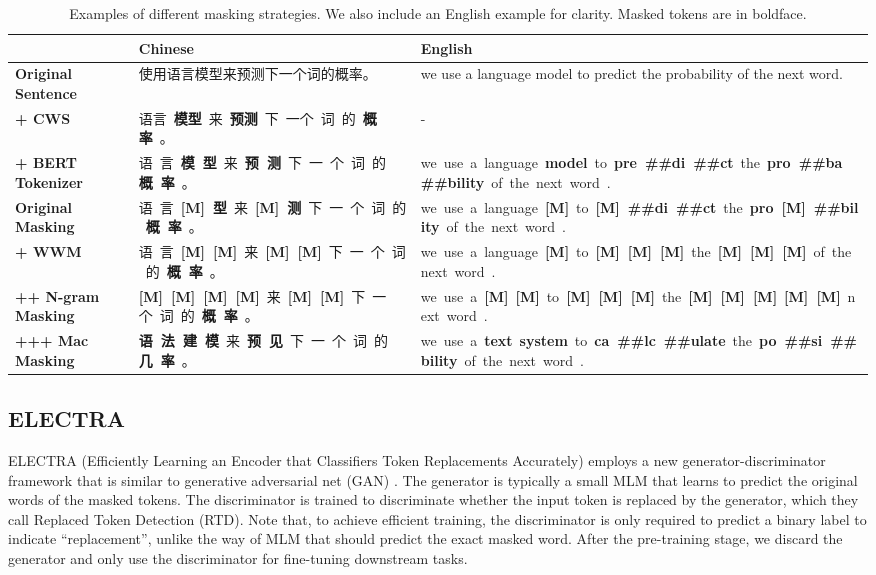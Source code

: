 \documentclass[journal]{IEEEtran}
\begin{document}
\begin{CJK*}{UTF8}{gbsn}
\begin{table*}[htbp]
\caption{\label{wwm-example} Examples of different masking strategies. We also include an English example for clarity. Masked tokens are in boldface.}
\scriptsize
\begin{center}
\begin{tabular}{l l l}
        \toprule
        & {\bf Chinese} & {\bf English} \\
        \midrule
	{\bf Original Sentence} & 使用语言模型来预测下一个词的概率。 & we use a language model to predict the probability of the next word.\\
        {\bf + CWS} & 语言~{\bf 模型}~来~{\bf 预测}~下~一个~词~的~{\bf 概率}~。 & - \\
        {\bf + BERT Tokenizer} & 语~言~{\bf 模~型}~来~{\bf 预~测}~下~一~个~词~的~{\bf 概~率}~。 & we~use~a~language~{\bf model}~to~{\bf pre~\#\#di~\#\#ct}~the~{\bf pro~\#\#ba~\#\#bility}~of~the~next~word~.  \\
        \midrule
        {\bf Original Masking} & 语~言~{\bf [M]~型}~来~{\bf [M]~测}~下~一~个~词~的~{\bf 概~率}~。 & we~use~a~language~{\bf [M]}~to~{\bf [M]~\#\#di~\#\#ct}~the~{\bf pro~[M]~\#\#bility}~of~the~next~word~.  \\
        {\bf + WWM} & 语~言~{\bf [M]~[M]}~来~{\bf [M]~[M]}~下~一~个~词~的~{\bf 概~率}~。 & we~use~a~language~{\bf [M]}~to~{\bf [M]~[M]~[M]}~the~{\bf [M]~[M]~[M]}~of~the~next~word~.  \\
        {\bf ++ N-gram Masking} & {\bf [M]~[M]~[M]~[M]}~来~{\bf [M]~[M]}~下~一~个~词~的~{\bf 概~率}~。  & we~use~a~{\bf [M]}~{\bf [M]}~to~{\bf [M]~[M]~[M]}~the~{\bf [M]~[M]~[M]}~{\bf [M]~[M]}~next~word~.  \\
        {\bf +++ Mac Masking} & {\bf 语~法~建~模}~来~{\bf 预~见}~下~一~个~词~的~{\bf 几~率}~。  & we~use~a~{\bf text}~{\bf system}~to~{\bf ca~\#\#lc~\#\#ulate}~the~{\bf po~\#\#si~\#\#bility}~of~the~next~word~.  \\
        \bottomrule
        \end{tabular}

\end{center}
\end{table*}


\subsection{ELECTRA}
ELECTRA (Efficiently Learning an Encoder that Classifiers Token Replacements Accurately) \cite{clark2020electra} employs a new generator-discriminator framework that is similar to generative adversarial net (GAN) \cite{goodfellow-gan-nips2014}.
The generator is typically a small MLM that learns to predict the original words of the masked tokens.
The discriminator is trained to discriminate whether the input token is replaced by the generator, which they call Replaced Token Detection (RTD).
Note that, to achieve efficient training, the discriminator is only required to predict a binary label to indicate ``replacement'', unlike the way of MLM that should predict the exact masked word.
After the pre-training stage, we discard the generator and only use the discriminator for fine-tuning downstream tasks.




\end{CJK*}
\end{document}
